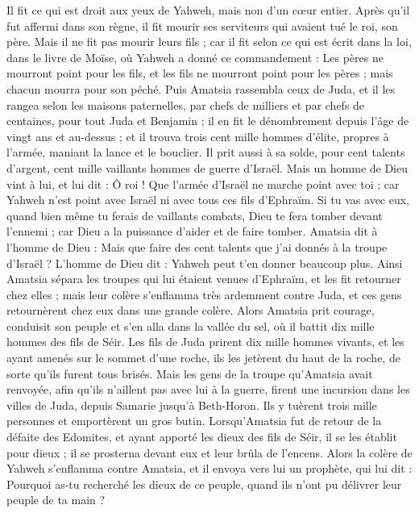 \begin{multicols}{2}
Il fit ce qui est droit aux yeux de Yahweh, mais non d'un cœur entier.
Après qu'il fut affermi dans son règne, il fit mourir ses serviteurs qui avaient tué le roi, son père.
Mais il ne fit pas mourir leurs fils ; car il fit selon ce qui est écrit dans la loi, dans le livre de Moïse, où Yahweh a donné ce commandement : Les pères ne mourront point pour les fils, et les fils ne mourront point pour les pères ; mais chacun mourra pour son péché.
Puis Amatsia rassembla ceux de Juda, et il les rangea selon les maisons paternelles, par chefs de milliers et par chefs de centaines, pour tout Juda et Benjamin ; il en fit le dénombrement depuis l'âge de vingt ans et au-dessus ; et il trouva trois cent mille hommes d'élite, propres à l'armée, maniant la lance et le bouclier.
Il prit aussi à sa solde, pour cent talents d'argent, cent mille vaillants hommes de guerre d'Israël.
Mais un homme de Dieu vint à lui, et lui dit : Ô roi ! Que l'armée d'Israël ne marche point avec toi ; car Yahweh n'est point avec Israël ni avec tous ces fils d'Ephraïm.
Si tu vas avec eux, quand bien même tu ferais de vaillants combats, Dieu te fera tomber devant l'ennemi ; car Dieu a la puissance d'aider et de faire tomber.
Amatsia dit à l'homme de Dieu : Mais que faire des cent talents que j'ai donnés à la troupe d'Israël ? L'homme de Dieu dit : Yahweh peut t'en donner beaucoup plus.
Ainsi Amatsia sépara les troupes qui lui étaient venues d'Ephraïm, et les fit retourner chez elles ; mais leur colère s'enflamma très ardemment contre Juda, et ces gens retournèrent chez eux dans une grande colère.
Alors Amatsia prit courage, conduisit son peuple et s'en alla dans la vallée du sel, où il battit dix mille hommes des fils de Séir.
Les fils de Juda prirent dix mille hommes vivants, et les ayant amenés sur le sommet d'une roche, ils les jetèrent du haut de la roche, de sorte qu'ils furent tous brisés.
Mais les gens de la troupe qu'Amatsia avait renvoyée, afin qu'ils n’aillent pas avec lui à la guerre, firent une incursion dans les villes de Juda, depuis Samarie jusqu'à Beth-Horon. Ils y tuèrent trois mille personnes et emportèrent un gros butin.
Lorsqu'Amatsia fut de retour de la défaite des Edomites, et ayant apporté les dieux des fils de Séir, il se les établit pour dieux ; il se prosterna devant eux et leur brûla de l’encens.
Alors la colère de Yahweh s'enflamma contre Amatsia, et il envoya vers lui un prophète, qui lui dit : Pourquoi as-tu recherché les dieux de ce peuple, quand ils n'ont pu délivrer leur peuple de ta main ?

\end{multicols}

